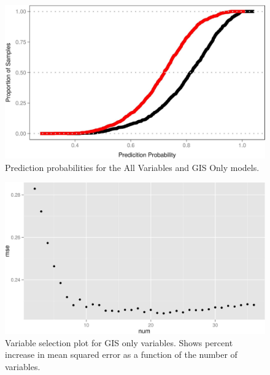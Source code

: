\documentclass[11pt,]{article}
\begin{document}
\begin{figure}[htbp]
\centering
\includegraphics{manuscript_files/figure-latex/unnamed-chunk-1-1.jpeg}
\caption{Prediction probabilities for the All Variables and GIS Only
models. \label{fig:prob_cdf}}
\end{figure}

\newpage

\newpage

\newpage

\begin{figure}[htbp]
\centering
\includegraphics{manuscript_files/figure-latex/gis_var_sel_figure-1.jpeg}
\caption{Variable selection plot for GIS only variables. Shows percent
increase in mean squared error as a function of the number of variables.
\label{fig:gis_varsel_figure}}
\end{figure}

\newpage
\end{document}
